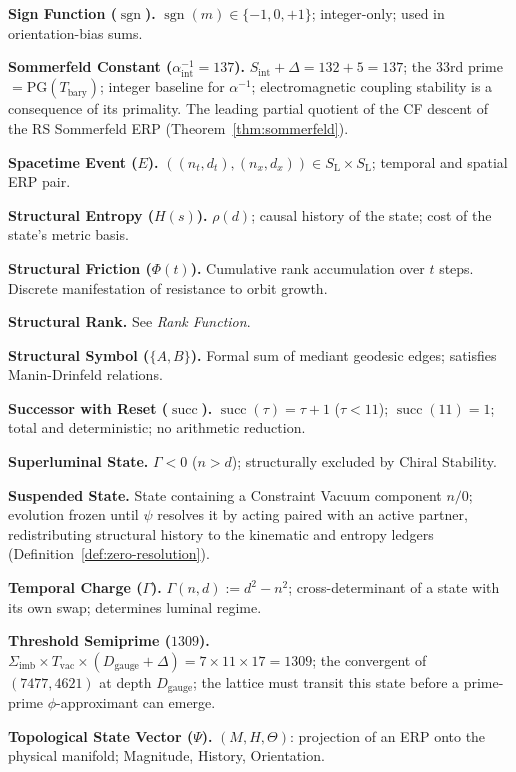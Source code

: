 \documentclass[11pt, letterpaper]{article}
\newcommand{\SL}{S_{\mathrm{L}}}
\renewcommand{\succ}{\operatorname{succ}}
\newcommand{\rank}{\rho}
\newcommand{\sgn}{\operatorname{sgn}}
\newcommand{\Tbary}{T_{\mathrm{bary}}}
\newcommand{\Psistate}{\Psi}
\newcommand{\Tcharge}{\Gamma}
\newcommand{\Dg}{D_{\mathrm{gauge}}}
\newcommand{\Sint}{S_{\mathrm{int}}}
\newcommand{\Sigimb}{\Sigma_{\mathrm{imb}}}
\newcommand{\PG}{\mathrm{PG}}
\newcommand{\aSC}{\alpha^{-1}_{\mathrm{int}}}
\theoremstyle{definition}
\theoremstyle{plain}
\begin{document}
\medskip\noindent\textbf{Sign Function ($\sgn$).}
$\sgn(m)\in\{-1,0,+1\}$; integer-only; used in orientation-bias sums.

\medskip\noindent\textbf{Sommerfeld Constant ($\aSC=137$).}
$\Sint+\Delta=132+5=137$; the 33rd prime $=\PG(\Tbary)$; integer baseline
for $\alpha^{-1}$; electromagnetic coupling stability is a consequence of
its primality.  The leading partial quotient of the CF descent of the RS
Sommerfeld ERP (Theorem~\ref{thm:sommerfeld}).

\medskip\noindent\textbf{Spacetime Event ($E$).}
$((n_t,d_t),(n_x,d_x))\in\SL\times\SL$; temporal and spatial ERP pair.

\medskip\noindent\textbf{Structural Entropy ($H(s)$).}
$\rank(d)$; causal history of the state; cost of the state's metric basis.

\medskip\noindent\textbf{Structural Friction ($\Phi(t)$).}
Cumulative rank accumulation over $t$ steps.
Discrete manifestation of resistance to orbit growth.

\medskip\noindent\textbf{Structural Rank.}
See \textit{Rank Function}.

\medskip\noindent\textbf{Structural Symbol ($\{A,B\}$).}
Formal sum of mediant geodesic edges; satisfies Manin-Drinfeld relations.

\medskip\noindent\textbf{Successor with Reset ($\succ$).}
$\succ(\tau)=\tau+1$ ($\tau<11$); $\succ(11)=1$; total and deterministic; no
arithmetic reduction.

\medskip\noindent\textbf{Superluminal State.}
$\Tcharge<0$ ($n>d$); structurally excluded by Chiral Stability.

\medskip\noindent\textbf{Suspended State.}
State containing a Constraint Vacuum component $n/0$; evolution frozen
until $\psi$ resolves it by acting paired with an active partner,
redistributing structural history to the kinematic and entropy ledgers
(Definition~\ref{def:zero-resolution}).

\medskip\noindent\textbf{Temporal Charge ($\Gamma$).}
$\Tcharge(n,d):=d^2-n^2$; cross-determinant of a state with its own swap;
determines luminal regime.

\medskip\noindent\textbf{Threshold Semiprime ($1309$).}
$\Sigimb\times T_{\mathrm{vac}}\times(\Dg+\Delta)=7\times 11\times 17=1309$;
the convergent of $(7477,4621)$ at depth $\Dg$; the lattice must transit this
state before a prime-prime $\phi$-approximant can emerge.

\medskip\noindent\textbf{Topological State Vector ($\Psistate$).}
$(M,H,\Theta)$: projection of an ERP onto the physical manifold; Magnitude,
History, Orientation.
\end{document}
